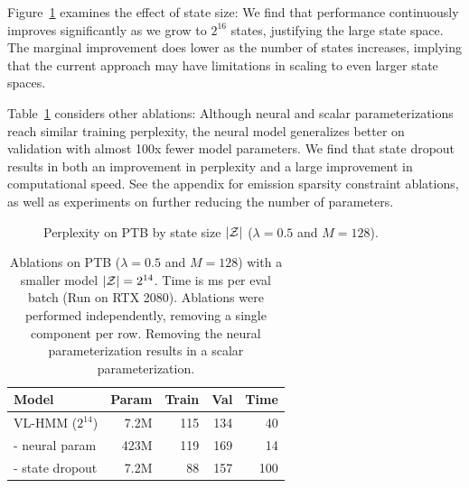 \documentclass[11pt,a4paper]{article}
\begin{document}
Figure~\ref{tbl:states-ablation} examines the effect of state size:
We find that performance continuously improves significantly as we grow to $2^{16}$ states,
justifying the large state space.
The marginal improvement does lower as the number of states increases,
implying that the current approach may have limitations in scaling to even larger state spaces.

Table~\ref{tbl:dropout-param-ablation} considers other ablations:
Although neural and scalar parameterizations reach similar training perplexity,
the neural model generalizes better on validation
with almost 100x fewer model parameters.
We find that state dropout results in both an improvement in perplexity and
a large improvement in computational speed.
See the appendix for emission sparsity constraint ablations,
as well as experiments on further reducing the number of parameters.

\begin{figure}[!t]
\centering
{}
\caption{\label{tbl:states-ablation}
Perplexity on \textsc{PTB} by state size $|\mathcal{Z}|$ ($\lambda =0.5$ and $M=128$).
}
\end{figure}


\begin{table}[!t]
\centering
\begin{tabular}{lrrrr}
\toprule
Model                & Param & Train  & Val  &  Time \\
\midrule
VL-HMM ($2^{14}$)    & 7.2M & 115    & 134  & 40\\
\quad - neural param & 423M & 119    & 169  & 14\\
\quad - state dropout      & 7.2M & 88     & 157  & 100\\
\bottomrule
\end{tabular}
\caption{\label{tbl:dropout-param-ablation}
Ablations on \textsc{PTB} ($\lambda =0.5$ and $M=128$) with a smaller model $|\mathcal{Z}| = 2^{14}$. 
Time is ms per eval batch (Run on RTX 2080).
Ablations were performed independently, removing a single component per row. Removing the neural parameterization results in a scalar parameterization.
} 
\end{table}
\end{document}
